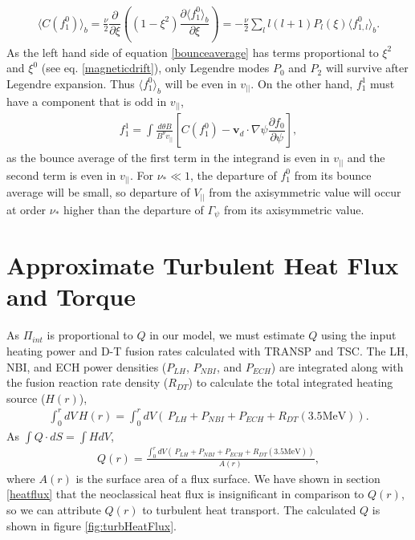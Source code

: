 \documentclass{article}
\numberwithin{figure}{section}
\numberwithin{equation}{section}
\newcommand{\partder}[2]{\dfrac{\partial  #1}{\partial  #2}} %
\begin{document}
\begin{gather}
\langle C(f_1^0) \rangle_b = \frac{\nu}{2} \partder{}{\xi} \left( \left(1 - \xi^2\right) \partder{\langle f^0_1\rangle_b}{\xi}  \right) = -\frac{\nu}{2} \sum_l l(l+1)  P_l(\xi) \langle f_{1,l}^0 \rangle_b.
\end{gather}
As the left hand side of equation \ref{bounceaverage} has terms proportional to $\xi^2$ and $\xi^0$ (see eq. \ref{magneticdrift}), only Legendre modes $P_0$ and $P_2$ will survive after Legendre expansion. Thus $\langle f_1^0 \rangle_b$ will be even in $v_{||}$. On the other hand, $f_{1}^1$ must have a component that is odd in $v_{||}$,
\begin{gather}
f_{1}^1 = \int \frac{d \theta B}{B^{\theta} v_{||}} \left[C(f_1^0) - \bm{v}_d \cdot \nabla \psi \partder{f_0}{\psi} \right],
\end{gather}
as the bounce average of the first term in the integrand is even in $v_{||}$ and the second term is even in $v_{||}$.
For $\nu_* \ll 1$, the departure of $f_1^0$ from its bounce average will be small, so departure of $V_{||}$ from the axisymmetric value will occur at order $\nu_*$ higher than the departure of $\Gamma_{\psi}$ from its axisymmetric value.

\section{Approximate Turbulent Heat Flux and Torque}\label{turbQ}

As $\Pi_{int}$ is proportional to $Q$ in our model, we must estimate $Q$ using the input heating power and D-T fusion rates calculated with TRANSP and TSC. The LH, NBI, and ECH power densities ($P_{LH}$, $P_{NBI}$, and $P_{ECH}$) are integrated along with the fusion reaction rate density ($R_{DT}$) to calculate the total integrated heating source ($H(r)$),
\begin{gather}
\int_0^r dV \, H(r) = \int_0^r dV \left(\, P_{LH} + P_{NBI} + P_{ECH} + R_{DT} (3.5 \text{MeV}) \right).
\end{gather}
As $\int Q \cdot dS = \int H dV$, 
\begin{gather}
Q(r) = \frac{\int_0^r dV \left(\, P_{LH} + P_{NBI} + P_{ECH} + R_{DT} (3.5 \text{MeV}) \right)}{A(r)},
\end{gather}
where $A(r)$ is the surface area of a flux surface. We have shown in section \ref{heatflux} that the neoclassical heat flux is insignificant in comparison to $Q(r)$, so we can attribute $Q(r)$ to turbulent heat transport. The calculated $Q$ is shown in figure \ref{fig:turbHeatFlux}.
\end{document}
